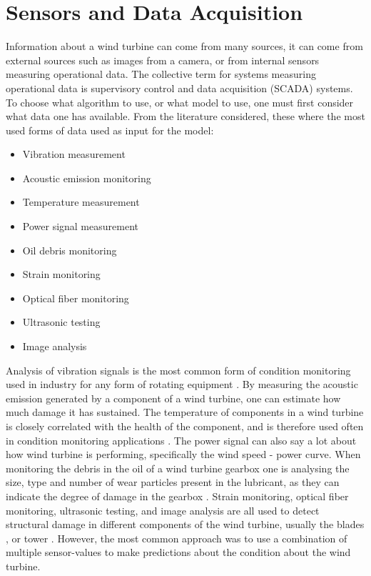\section{Sensors and Data Acquisition}

Information about a wind turbine can come from many sources, it can come from external sources such as images from a camera, or from internal sensors measuring operational data. 
The collective term for systems measuring operational data is supervisory control and data acquisition (SCADA) systems. 
To choose what algorithm to use, or what model to use, one must first consider what data one has available. 
From the literature considered, these where the most used forms of data used as input for the model:

\begin{itemize}
    \item Vibration measurement  
    \item Acoustic emission monitoring 
    \item Temperature measurement 
    \item Power signal measurement 
    \item Oil debris monitoring 
    \item Strain monitoring 
    \item Optical fiber monitoring 
    \item Ultrasonic testing 
    \item Image analysis
\end{itemize}

Analysis of vibration signals is the most common form of condition monitoring used in industry for any form of rotating equipment \cite{wt_bearing_cm_review}. 
By measuring the acoustic emission generated by a component of a wind turbine, one can estimate how much damage it has sustained. 
The temperature of components in a wind turbine is closely correlated with the health of the component, and is therefore used often in condition monitoring applications \cite{DBN_chicken_swarm_optim}. 
The power signal can also say a lot about how wind turbine is performing, specifically the wind speed - power curve. 
When monitoring the debris in the oil of a wind turbine gearbox one is analysing the size, type and number of wear particles present in the lubricant, as they can indicate the degree of damage in the gearbox \cite{cm_rnn_lstm}. 
Strain monitoring, optical fiber monitoring, ultrasonic testing, and image analysis are all used to detect structural damage in different components of the wind turbine, usually the blades \cite{lin_and_non_lin_feat_for_ice_detection_on_blades, image_based_surface_damage_detection_DL_drone_inspection,image_based_YOLO_YSODA, dirt_n_mud_detection_using_guided_waves,blade_defect_detection_imaging_array, unsupervised_AD_blade_damage_deep_features_images}, or tower \cite{wt_cm_rev_new_trends_chal_2014}. 
However, the most common approach was to use a combination of multiple sensor-values to make predictions about the condition about the wind turbine.

